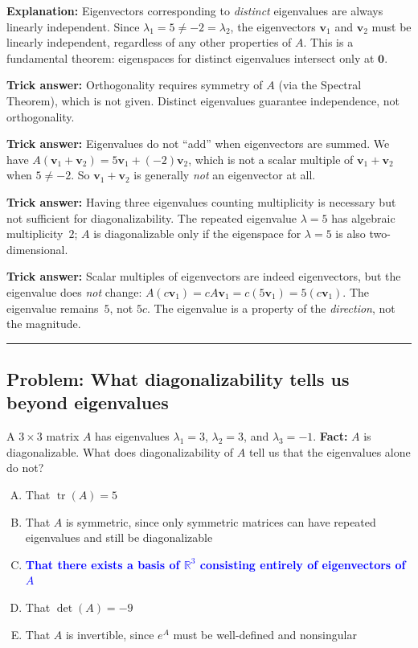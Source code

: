 \documentclass[12pt]{amsart}
\newcommand{\divider}{
  \vspace{-1em}
  \noindent
  \raisebox{-0.15ex}{\textbullet}%
  \hspace{0.5em}%
  \rule[0.5ex]{0.95\textwidth}{1.0pt}%
  \hspace{0.5em}%
  \raisebox{-0.15ex}{\textbullet}%
  \vspace{0em}
}
\begin{document}
\textbf{Explanation:}
Eigenvectors corresponding to \emph{distinct} eigenvalues are always
linearly independent. Since $\lambda_1 = 5 \neq -2 = \lambda_2$, the
eigenvectors $\mathbf{v}_1$ and $\mathbf{v}_2$ must be linearly
independent, regardless of any other properties of $A$. This is a
fundamental theorem: eigenspaces for distinct eigenvalues intersect
only at $\mathbf{0}$.

\textbf{Trick answer:}
Orthogonality requires symmetry of $A$ (via the Spectral Theorem),
which is not given. Distinct eigenvalues guarantee independence, not
orthogonality.

\textbf{Trick answer:}
Eigenvalues do not ``add'' when eigenvectors are summed.
We have $A(\mathbf{v}_1 + \mathbf{v}_2) = 5\mathbf{v}_1 + (-2)\mathbf{v}_2$,
which is not a scalar multiple of $\mathbf{v}_1 + \mathbf{v}_2$ when
$5 \neq -2$. So $\mathbf{v}_1 + \mathbf{v}_2$ is generally \emph{not}
an eigenvector at all.

\textbf{Trick answer:}
Having three eigenvalues counting multiplicity is necessary but not
sufficient for diagonalizability. The repeated eigenvalue $\lambda = 5$
has algebraic multiplicity~$2$; $A$ is diagonalizable only if the
eigenspace for $\lambda = 5$ is also two-dimensional.

\textbf{Trick answer:}
Scalar multiples of eigenvectors are indeed eigenvectors, but the
eigenvalue does \emph{not} change:
$A(c\mathbf{v}_1) = cA\mathbf{v}_1 = c(5\mathbf{v}_1) = 5(c\mathbf{v}_1)$.
The eigenvalue remains~$5$, not $5c$. The eigenvalue is a property of
the \emph{direction}, not the magnitude.

\divider

\subsection*{Problem: What diagonalizability tells us beyond eigenvalues}

A $3 \times 3$ matrix $A$ has eigenvalues $\lambda_1 = 3$, $\lambda_2 = 3$,
and $\lambda_3 = -1$. {\bf Fact:} $A$ is diagonalizable.
What does diagonalizability of $A$ tell us that the eigenvalues alone do not?

\begin{enumerate}[(A)]
\item That $\operatorname{tr}(A) = 5$
\item That $A$ is symmetric, since only symmetric matrices can have
      repeated eigenvalues and still be diagonalizable
\item \textcolor{blue}{\textbf{That there exists a basis of $\mathbb{R}^3$
      consisting entirely of eigenvectors of $A$}}
\item That $\det(A) = -9$
\item That $A$ is invertible, since $e^A$ must be well-defined
      and nonsingular
\end{enumerate}
\end{document}
